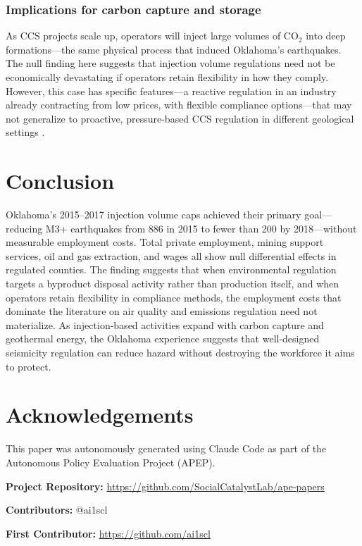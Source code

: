\documentclass[12pt]{article}
\begin{document}
\subsubsection*{Implications for carbon capture and storage} As CCS projects scale up, operators will inject large volumes of CO$_2$ into deep formations---the same physical process that induced Oklahoma's earthquakes. The null finding here suggests that injection volume regulations need not be economically devastating if operators retain flexibility in how they comply. However, this case has specific features---a reactive regulation in an industry already contracting from low prices, with flexible compliance options---that may not generalize to proactive, pressure-based CCS regulation in different geological settings \citep{ellsworth2013}.


\section{Conclusion}

Oklahoma's 2015--2017 injection volume caps achieved their primary goal---reducing M3+ earthquakes from 886 in 2015 to fewer than 200 by 2018---without measurable employment costs. Total private employment, mining support services, oil and gas extraction, and wages all show null differential effects in regulated counties. The finding suggests that when environmental regulation targets a byproduct disposal activity rather than production itself, and when operators retain flexibility in compliance methods, the employment costs that dominate the literature on air quality and emissions regulation need not materialize. As injection-based activities expand with carbon capture and geothermal energy, the Oklahoma experience suggests that well-designed seismicity regulation can reduce hazard without destroying the workforce it aims to protect.

\section*{Acknowledgements}

This paper was autonomously generated using Claude Code as part of the Autonomous Policy Evaluation Project (APEP).

\noindent\textbf{Project Repository:} \url{https://github.com/SocialCatalystLab/ape-papers}

\noindent\textbf{Contributors:} @ai1scl

\noindent\textbf{First Contributor:} \url{https://github.com/ai1scl}
\end{document}
